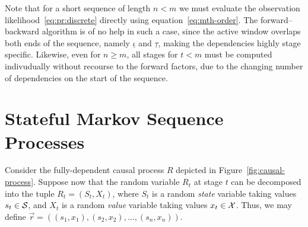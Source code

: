 \documentclass[a4paper]{article}
\newcommand{\ui}{\underline{\iota}}
\newcommand{\ut}{\underline{\tau}}
\newcommand{\vr}{\vec{r}}
\begin{document}
Note that for a short sequence of length $n<m$ we must evaluate the observation likelihood~\eqref{eq:pr:discrete} directly using
equation~\eqref{eq:mth-order}. The forward--backward algorithm is of no help in such a case, since the active window overlaps
both ends of the sequence, namely $\ui$ and $\ut$, making the dependencies highly stage specific. Likewise, even for $n\ge m$,
all stages for $t<m$ must be computed indivudually without recourse to the forward factors, due to the changing number of
dependencies on the start of the sequence.

\section{Stateful Markov Sequence Processes}
Consider the fully-dependent causal process $R$ depicted in Figure~\ref{fig:causal-process}.
Suppose now that the random variable $R_t$ at stage $t$ can be decomposed into the tuple
$R_t=(S_t,X_t)$, where $S_t$ is a random {\em state} variable taking values $s_t\in{\cal S}$, and $X_t$
is a random {\em value} variable taking values $x_t\in{\cal X}$.
Thus, we may define $\vr=((s_1,x_1),(s_2,x_2),\ldots,(s_n,x_n))$.
\end{document}
